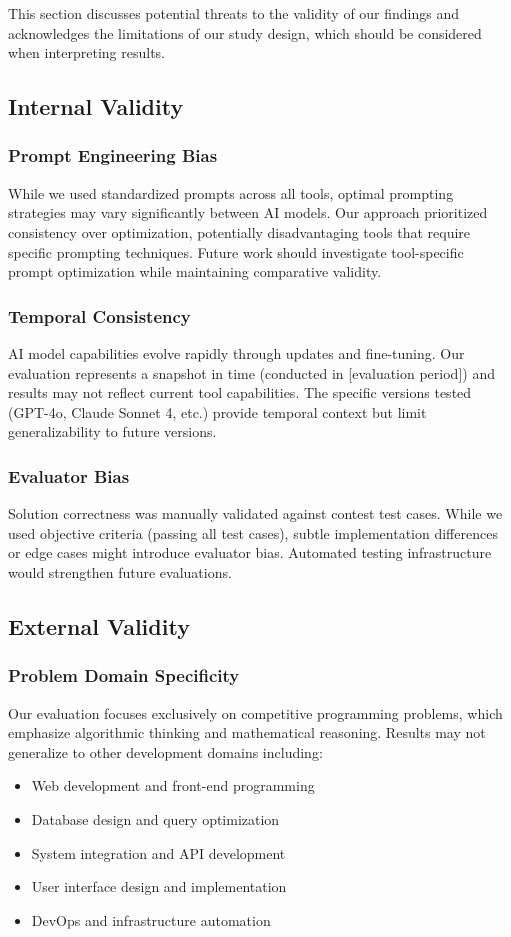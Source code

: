 \documentclass[conference]{IEEEtran}
\begin{document}
This section discusses potential threats to the validity of our findings and acknowledges the limitations of our study design, which should be considered when interpreting results.

\subsection{Internal Validity}

\subsubsection{Prompt Engineering Bias}
While we used standardized prompts across all tools, optimal prompting strategies may vary significantly between AI models. Our approach prioritized consistency over optimization, potentially disadvantaging tools that require specific prompting techniques. Future work should investigate tool-specific prompt optimization while maintaining comparative validity.

\subsubsection{Temporal Consistency}
AI model capabilities evolve rapidly through updates and fine-tuning. Our evaluation represents a snapshot in time (conducted in [evaluation period]) and results may not reflect current tool capabilities. The specific versions tested (GPT-4o, Claude Sonnet 4, etc.) provide temporal context but limit generalizability to future versions.

\subsubsection{Evaluator Bias}
Solution correctness was manually validated against contest test cases. While we used objective criteria (passing all test cases), subtle implementation differences or edge cases might introduce evaluator bias. Automated testing infrastructure would strengthen future evaluations.

\subsection{External Validity}

\subsubsection{Problem Domain Specificity}
Our evaluation focuses exclusively on competitive programming problems, which emphasize algorithmic thinking and mathematical reasoning. Results may not generalize to other development domains including:
\begin{itemize}
    \item Web development and front-end programming
    \item Database design and query optimization
    \item System integration and API development
    \item User interface design and implementation
    \item DevOps and infrastructure automation
\end{itemize}
\end{document}
